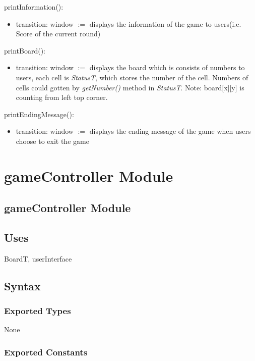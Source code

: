 \documentclass[12pt]{article}
\begin{document}
\noindent printInformation():
\begin{itemize}
  \item transition: window $:=$ displays the information of the game to users(i.e. Score of the current round)
\end{itemize}

\noindent printBoard():
\begin{itemize}
  \item transition: window $:=$ displays the board which is consists of numbers to users, each cell is \textit{StatusT}, which stores the number
        of the cell. Numbers of cells could gotten by \textit{getNumber()} method in \textit{StatusT}. Note: board[x][y] is counting from
        left top corner.
\end{itemize}

\noindent printEndingMessage():
\begin{itemize}
  \item transition: window $:=$ displays the ending message of the game when users choose to exit the game
\end{itemize}

\newpage

\section* {gameController Module}

\subsection* {gameController Module}

\subsection* {Uses}

BoardT, userInterface

\subsection* {Syntax}

\subsubsection* {Exported Types}

None

\subsubsection* {Exported Constants}
\end{document}

